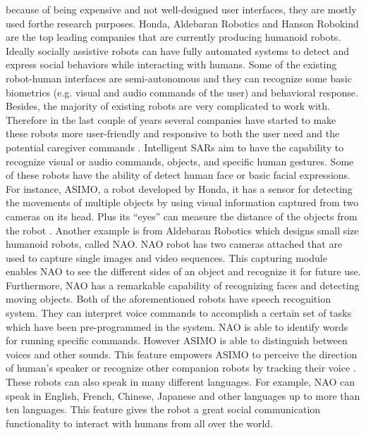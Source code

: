 because of being expensive and not well-designed user interfaces, they are mostly used forthe 
research purposes. Honda, Aldebaran Robotics and Hanson Robokind are the top
leading companies that are currently producing humanoid robots.
Ideally socially assistive robots can have fully automated systems to detect and
express social behaviors while interacting with humans. Some of the existing robot-human
interfaces are semi-autonomous and they can recognize some basic biometrics (e.g. visual
and audio commands of the user) and behavioral response. Besides, the majority of existing
robots are very complicated to work with. Therefore in the last couple of years several
companies have started to make these robots more user-friendly and responsive to both the
user need and the potential caregiver commands \cite{DefineSocial2005}.
Intelligent SARs aim to have the capability to recognize visual or audio commands,
objects, and specific human gestures. Some of these robots have the ability of detect human
face or basic facial expressions. For instance, ASIMO, a robot developed by Honda, it has
a sensor for detecting the movements of multiple objects by using visual information
captured from two cameras on its head. Plus its “eyes” can measure the distance of the
objects from the robot \cite{ASIMO2011}. Another example is from Aldebaran Robotics which designs
small size humanoid robots, called NAO. NAO robot has two cameras attached that are
used to capture single images and video sequences. This capturing module enables NAO
to see the different sides of an object and recognize it for future use. Furthermore, NAO
has a remarkable capability of recognizing faces and detecting moving objects.
Both of the aforementioned robots have speech recognition system. They can interpret
voice commands to accomplish a certain set of tasks which have been pre-programmed in
the system. NAO is able to identify words for running specific commands. However
ASIMO is able to distinguish between voices and other sounds. This feature empowers
ASIMO to perceive the direction of human’s speaker or recognize other companion robots
by tracking their voice \cite{DSMIV2000}. These robots can also speak in many different languages. For
example, NAO can speak in English, French, Chinese, Japanese and other languages up to
more than ten languages. This feature gives the robot a great social communication
functionality to interact with humans from all over the world.

